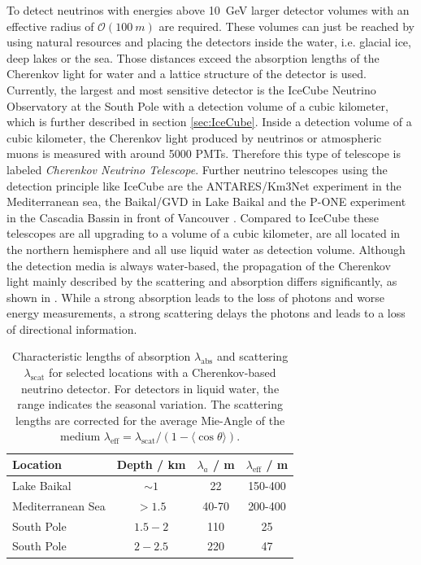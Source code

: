 To detect neutrinos with energies above \SI{10}{GeV} larger detector volumes with an effective radius of $\mathcal{O}(\SI{100}{m})$ are required.
These volumes can just be reached by using natural resources and placing the detectors inside the water, i.e. glacial ice, deep lakes or the sea.
Those distances exceed the absorption lengths of the Cherenkov light for water and a lattice structure of the detector is used.
Currently, the largest and most sensitive detector is the IceCube Neutrino Observatory at the South Pole with a detection volume of a cubic kilometer, which is further described in section \ref{sec:IceCube}.
Inside a detection volume of a cubic kilometer, the Cherenkov light produced by neutrinos or atmospheric muons is measured with around 5000 PMTs.
Therefore this type of telescope is labeled \textit{Cherenkov Neutrino Telescope}.
Further neutrino telescopes using the detection principle like IceCube are the ANTARES/Km3Net \cite{ANTARES11, KM3Net16} experiment in the Mediterranean sea, the Baikal/GVD in Lake Baikal \cite{Baikal97, GVD19} and the P-ONE experiment in the Cascadia Bassin in front of Vancouver \cite{PONE20}.
Compared to IceCube these telescopes are all upgrading to a volume of a cubic kilometer, are all located in the northern hemisphere and all use liquid water as detection volume.
Although the detection media is always water-based, the propagation of the Cherenkov light mainly described by the scattering and absorption differs significantly, as shown in .
While a strong absorption leads to the loss of photons and worse energy measurements, a strong scattering delays the photons and leads to a loss of directional information.
\begin{table}
    \caption{Characteristic lengths of absorption $\lambda_{\text{abs}}$ and scattering $\lambda_{\text{scat}}$ for selected locations with a Cherenkov-based neutrino detector. For detectors in liquid water, the range indicates the seasonal variation. The scattering lengths are corrected for the average Mie-Angle of the medium $\lambda_{\text{eff}}=\lambda_{\text{scat}}/(1-\langle\cos \theta\rangle)$. \cite{Bottner16BadHonnef}}
    \label{tab:len_abs_scat}
    \begin{center}
    \begin{tabular}{l c c c}
        \toprule
        Location & Depth / km & $\lambda_a$ / m & $\lambda_{\text{eff}}$ / m \\
        \midrule
        Lake Baikal & $\sim 1$ & 22 & 150-400 \\
        Mediterranean Sea & $> 1.5$ & 40-70 & 200-400 \\
        South Pole & $1.5 - 2$ & 110 & 25 \\
        South Pole & $2 - 2.5$ & 220 & 47 \\
        \bottomrule
    \end{tabular}
    \end{center}
\end{table}

